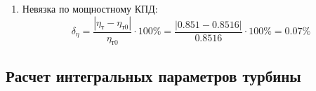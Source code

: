 \documentclass[a4paper,10pt]{article}
\begin{document}
\begin{enumerate}
\begin{enumerate}
        \end{enumerate}

        

        \item Невязка по мощностному КПД:
        \[
            \delta_\eta = \frac{ \left| \eta_т - \eta_{т0} \right| }{ \eta_{т0} } \cdot 100 \% =
                \frac{
                    \left| 0.851 - 0.8516 \right|
                }{
                    0.8516 } \cdot 100 \% =
            0.07 \%
        \]

    \end{enumerate}
     

    \subsection{Расчет интегральных параметров турбины}

    
\end{document}
